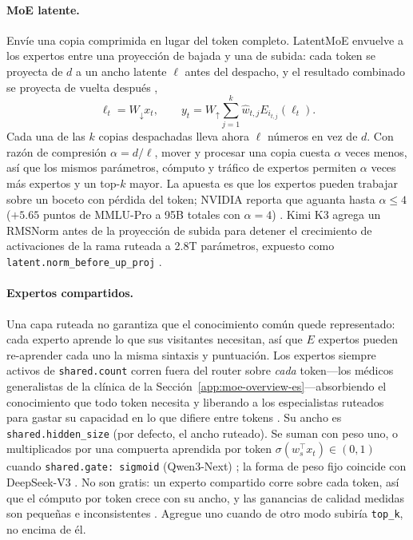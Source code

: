 \paragraph{MoE latente.}
Envíe una copia comprimida en lugar del token completo. LatentMoE envuelve a
los expertos entre una proyección de bajada y una de subida: cada token se
proyecta de $d$ a un ancho latente $\ell$ antes del despacho, y el resultado
combinado se proyecta de vuelta después \citep{elango2026latentmoe},
\begin{equation}
  \ell_t = W_\downarrow x_t,\qquad
  y_t = W_\uparrow \sum_{j=1}^{k} \hat w_{t,j} E_{i_{t,j}}(\ell_t).
  \label{eq:latent-es}
\end{equation}
Cada una de las $k$ copias despachadas lleva ahora $\ell$ números en vez de
$d$. Con razón de compresión $\alpha = d/\ell$, mover y procesar una copia
cuesta $\alpha$ veces menos, así que los mismos parámetros, cómputo y tráfico
de expertos permiten $\alpha$ veces más expertos y un top-$k$ mayor. La apuesta
es que los expertos pueden trabajar sobre un boceto con pérdida del token;
NVIDIA reporta que aguanta hasta $\alpha \leqslant 4$ ($+5.65$ puntos de
MMLU-Pro a 95B totales con $\alpha = 4$) \citep{elango2026latentmoe}. Kimi K3
agrega un RMSNorm antes de la proyección de subida para detener el crecimiento
de activaciones de la rama ruteada a 2.8T parámetros, expuesto como
\texttt{latent.norm\_before\_up\_proj} \citep{kimiteam2026k3}.

\paragraph{Expertos compartidos.}
Una capa ruteada no garantiza que el conocimiento común quede representado:
cada experto aprende lo que sus visitantes necesitan, así que $E$ expertos
pueden re-aprender cada uno la misma sintaxis y puntuación. Los expertos
siempre activos de \texttt{shared.count} corren fuera del router sobre
\emph{cada} token---los médicos generalistas de la clínica de la
Sección~\ref{app:moe-overview-es}---absorbiendo el conocimiento que todo token
necesita y liberando a los especialistas ruteados para gastar su capacidad en
lo que difiere entre tokens \citep{dai2024deepseekmoe}. Su ancho es
\texttt{shared.hidden\_size} (por defecto, el ancho ruteado). Se suman con peso
uno, o multiplicados por una compuerta aprendida por token
$\sigma(w_s^{\top} x_t) \in (0,1)$ cuando \texttt{shared.gate: sigmoid}
(Qwen3-Next) \citep{qwen2025qwen3}; la forma de peso fijo coincide con
DeepSeek-V3 \citep{deepseek2024v3}. No son gratis: un experto compartido corre
sobre cada token, así que el cómputo por token crece con su ancho, y las
ganancias de calidad medidas son pequeñas e inconsistentes
\citep{li2026slicing}. Agregue uno cuando de otro modo subiría
\texttt{top\_k}, no encima de él.

